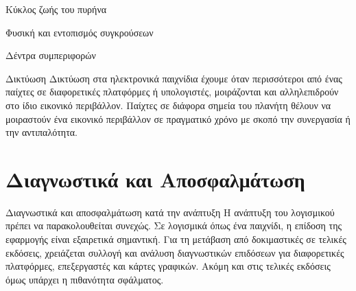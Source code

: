\documentclass{beamer}
\begin{document}
	\begin{frame}{Κύκλος ζωής του πυρήνα}
		\begin{figure}
			\centering
			\resizebox{5.0cm}{!}{}
		\end{figure}
		\cite{citeulike:13049596}	
	\end{frame}

	\begin{frame}{Φυσική και εντοπισμός συγκρούσεων}
		\begin{figure}
			\centering
			\resizebox{10.5cm}{!}{}
		\end{figure}
		\cite{realtime_collision04}
	\end{frame}
	
	\begin{frame}{Δέντρα συμπεριφορών}
		\begin{figure}
			\centering
			\resizebox{10.5cm}{!}{}
		\end{figure}
		\cite{champandard2007understanding}
	\end{frame}

	\begin{frame}{Δικτύωση}
		Δικτύωση στα ηλεκτρονικά παιχνίδια έχουμε όταν περισσότεροι από ένας παίχτες σε διαφορετικές πλατφόρμες ή υπολογιστές, μοιράζονται και αλληλεπιδρούν στο ίδιο εικονικό περιβάλλον. Παίχτες σε διάφορα σημεία του πλανήτη θέλουν να μοιραστούν ένα εικονικό περιβάλλον σε πραγματικό χρόνο με σκοπό την συνεργασία ή την αντιπαλότητα.
		\cite{sanja14}
	\end{frame}
	
	
	\section{Διαγνωστικά και Αποσφαλμάτωση}
	\begin{frame}{Διαγνωστικά και αποσφαλμάτωση κατά την ανάπτυξη}
		Η ανάπτυξη του λογισμικού πρέπει να παρακολουθείται συνεχώς. Σε λογισμικά όπως ένα παιχνίδι, η επίδοση της εφαρμογής είναι εξαιρετικά σημαντική. Για τη μετάβαση από δοκιμαστικές σε τελικές εκδόσεις, χρειάζεται συλλογή και ανάλυση διαγνωστικών επιδόσεων για διαφορετικές πλατφόρμες, επεξεργαστές και κάρτες γραφικών. Ακόμη και στις τελικές εκδόσεις όμως υπάρχει η πιθανότητα σφάλματος.         \cite{richter2012clr}
	\end{frame}
	
\end{document}
